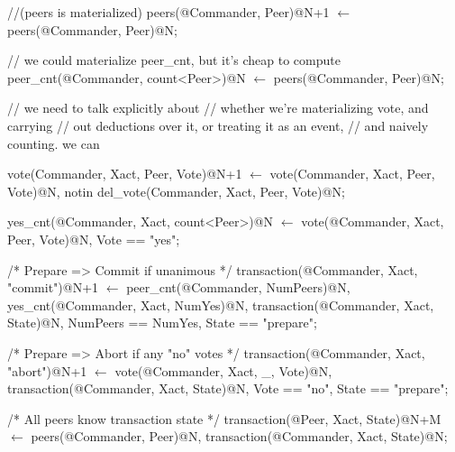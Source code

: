 \begin{Dedalus}
\small
//(peers is materialized)
peers(@Commander, Peer)@N+1 \(\leftarrow\)
    peers(@Commander, Peer)@N;

// we could materialize peer_cnt, but it's 
cheap to compute
peer_cnt(@Commander, count<Peer>)@N \(\leftarrow\)
  peers(@Commander, Peer)@N;

// we need to talk explicitly about 
// whether we're materializing vote, and carrying 
// out deductions over it, or treating it as an event, 
// and naively counting.  we can 

vote(Commander, Xact, Peer, Vote)@N+1 \(\leftarrow\)
    vote(Commander, Xact, Peer, Vote)@N,
    notin del_vote(Commander, Xact, Peer, Vote)@N;

yes_cnt(@Commander, Xact, count<Peer>)@N \(\leftarrow\)
  vote(@Commander, Xact, Peer, Vote)@N,
  Vote == "yes";

/* Prepare => Commit if unanimous */
transaction(@Commander, Xact, "commit")@N+1 \(\leftarrow\)
  peer_cnt(@Commander, NumPeers)@N,
  yes_cnt(@Commander, Xact, NumYes)@N,
  transaction(@Commander, Xact, State)@N,
  NumPeers == NumYes, State == "prepare";

/* Prepare => Abort if any "no" votes */
transaction(@Commander, Xact, "abort")@N+1 \(\leftarrow\)
  vote(@Commander, Xact, _, Vote)@N,
  transaction(@Commander, Xact, State)@N,
  Vote == "no", State == "prepare";

/* All peers know transaction state */
transaction(@Peer, Xact, State)@N+M \(\leftarrow\)
  peers(@Commander, Peer)@N,
  transaction(@Commander, Xact, State)@N;
\end{Dedalus}



